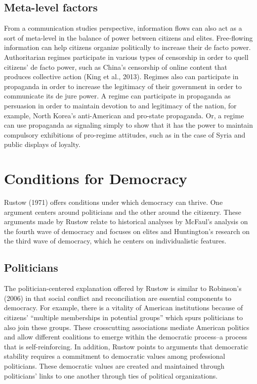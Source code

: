 \documentclass[12pt,]{article}
\begin{document}
\hypertarget{meta-level-factors}{%
\subsection{Meta-level factors}\label{meta-level-factors}}

From a communication studies perspective, information flows can also act
as a sort of meta-level in the balance of power between citizens and
elites. Free-flowing information can help citizens organize politically
to increase their de facto power. Authoritarian regimes participate in
various types of censorship in order to quell citizens' de facto power,
such as China's censorship of online content that produces collective
action (King et al., 2013). Regimes also can participate in propaganda
in order to increase the legitimacy of their government in order to
communicate its de jure power. A regime can participate in propaganda as
persuasion in order to maintain devotion to and legitimacy of the
nation, for example, North Korea's anti-American and pro-state
propaganda. Or, a regime can use propaganda as signaling simply to show
that it has the power to maintain compulsory exhibitions of pro-regime
attitudes, such as in the case of Syria and public displays of loyalty.

\hypertarget{conditions-for-democracy}{%
\section{Conditions for Democracy}\label{conditions-for-democracy}}

Rustow (1971) offers conditions under which democracy can thrive. One
argument centers around politicians and the other around the citizenry.
These arguments made by Rustow relate to historical analyses by McFaul's
analysis on the fourth wave of democracy and focuses on elites and
Huntington's research on the third wave of democracy, which he centers
on individualistic features.

\hypertarget{politicians}{%
\subsection{Politicians}\label{politicians}}

The politician-centered explanation offered by Rustow is similar to
Robinson's (2006) in that social conflict and reconciliation are
essential components to democracy. For example, there is a vitality of
American institutions because of citizens' ``multiple memberships in
potential groups'' which spurs politicians to also join these groups.
These crosscutting associations mediate American politics and allow
different coalitions to emerge within the democratic process--a process
that is self-reinforcing. In addition, Rustow points to arguments that
democratic stability requires a commitment to democratic values among
professional politicians. These democratic values are created and
maintained through politicians' links to one another through ties of
political organizations.
\end{document}
